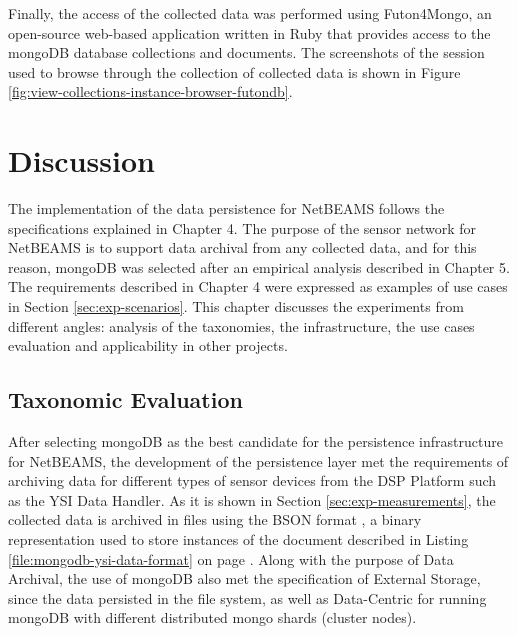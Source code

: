 Finally, the access of the collected data was performed using Futon4Mongo,
an open-source web-based application written in Ruby that provides access to the
mongoDB database collections and documents. The screenshots of the session used
to browse through the collection of collected data is shown in Figure
\ref{fig:view-collections-instance-browser-futondb}.

\section{Discussion}

The implementation of the data persistence for NetBEAMS follows the
specifications explained in Chapter 4. The purpose of the sensor network for
NetBEAMS is to support data archival from any collected data, and for this
reason, mongoDB was selected after an empirical analysis described in Chapter
5. The requirements described in Chapter 4 were expressed as examples of use
cases in Section \ref{sec:exp-scenarios}. This chapter discusses the
experiments from different angles: analysis of the taxonomies, the
infrastructure, the use cases evaluation and applicability in other projects.

\subsection{Taxonomic Evaluation}

After selecting mongoDB as the best candidate for the persistence
infrastructure for NetBEAMS, the development of the persistence layer met the
requirements of archiving data for different types of sensor devices from the
DSP Platform such as the YSI Data Handler. As it is shown in Section
\ref{sec:exp-measurements}, the collected data is archived in files using the
BSON format \cite{bson}, a binary representation used to store instances of
the document described in Listing \ref{file:mongodb-ysi-data-format} on page
\pageref{file:mongodb-ysi-data-format}. Along with the purpose of Data
Archival, the use of mongoDB also met the specification of External Storage,
since the data persisted in the file system, as well as Data-Centric for
running mongoDB with different distributed mongo shards (cluster nodes).

